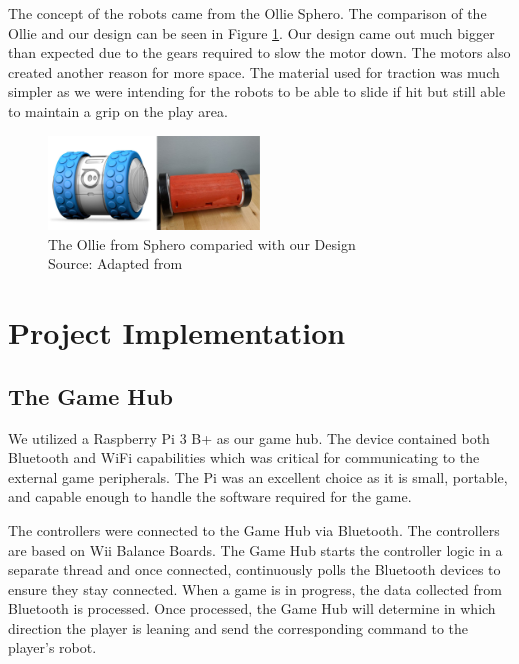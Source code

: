 \documentclass[11pt]{ieeeconf}
\begin{document}
The concept of the robots came from the Ollie Sphero. The comparison of the Ollie and our design can be seen in Figure \ref{Ollie}. Our design came out much bigger than expected due to the gears required to slow the motor down. The motors also created another reason for more space. The material used for traction was much simpler as we were intending for the robots to be able to slide if hit but still able to maintain a grip on the play area.

\begin{figure}[H]
\centering
\captionsetup{justification=centering}
\includegraphics[width=0.5\textwidth]{images/SideBySide.png}
\caption{The Ollie from Sphero comparied with our Design\\Source: Adapted from \cite{ollie:19}}
\label{Ollie}
\end{figure}


\section{Project Implementation}
\subsection{The Game Hub}

We utilized a Raspberry Pi 3 B+ as our game hub. The device contained both Bluetooth and WiFi capabilities which was critical for communicating to the external game peripherals. The Pi was an excellent choice as it is small, portable, and capable enough to handle the software required for the game. 

The controllers were connected to the Game Hub via Bluetooth. The controllers are based on Wii Balance Boards. The Game Hub starts the controller logic in a separate thread and once connected, continuously polls the Bluetooth devices to ensure they stay connected. When a game is in progress, the data collected from Bluetooth is processed. Once processed, the Game Hub will determine in which direction the player is leaning and send the corresponding command to the player's robot.
\end{document}
